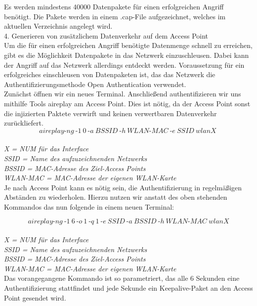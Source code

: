 Es werden mindestens 40000 Datenpakete für einen erfolgreichen Angriff benötigt. Die Pakete werden in einem .cap-File aufgezeichnet, welches im aktuellen Verzeichnis angelegt wird.\\

{\Large 4. Generieren von zusätzlichem Datenverkehr auf dem Access Point}\\
Um die für einen erfolgreichen Angriff benötigte Datenmenge schnell zu erreichen, gibt es die Möglichkeit Datenpakete in das Netzwerk einzuschleusen. Dabei kann der Angriff auf das Netzwerk allerdings entdeckt werden.
Voraussetzung für ein erfolgreiches einschleusen von Datenpaketen ist, das das Netzwerk die Authentifizierungsmethode Open Authentication verwendet. 
\\
Zunächst öffnen wir ein neues Terminal. Anschließend authentifizieren wir uns mithilfe Tools aireplay am Access Point. Dies ist nötig, da der Access Point sonst die injizierten Paktete verwirft und keinen verwertbaren Datenverkehr zurückliefert. 
$$aireplay\text{-}ng~\text{-}1~0~\text{-}a~BSSID~\text{-}h~WLAN\text{-}MAC~\text{-}e~SSID~wlanX~$$\\

\textit{X = NUM für das Interface}\\
\textit{SSID = Name des aufzuzeichnenden Netzwerks}\\
\textit{BSSID = MAC-Adresse des Ziel-Access Points}\\
\textit{WLAN-MAC = MAC-Adresse der eigenen WLAN-Karte}\\

Je nach Access Point kann es nötig sein, die Authentifizierung in regelmäßigen Abständen zu wiederholen. Hierzu nutzen wir anstatt des oben stehenden Kommandos das nun folgende in einem neuen Terminal:

$$aireplay\text{-}ng~\text{-}1~6~\text{-}o~1~\text{-}q~1~\text{-}e~SSID~\text{-}a~BSSID~\text{-}h~WLAN\text{-}MAC~wlanX$$\\

\textit{X = NUM für das Interface}\\
\textit{SSID = Name des aufzuzeichnenden Netzwerks}\\
\textit{BSSID = MAC-Adresse des Ziel-Access Points}\\
\textit{WLAN-MAC = MAC-Adresse der eigenen WLAN-Karte}\\

Das vorangegangene Kommando ist so parametriert, das alle 6 Sekunden eine Authentifizierung stattfindet und jede Sekunde ein Keepalive-Paket an den Access Point gesendet wird.\\

